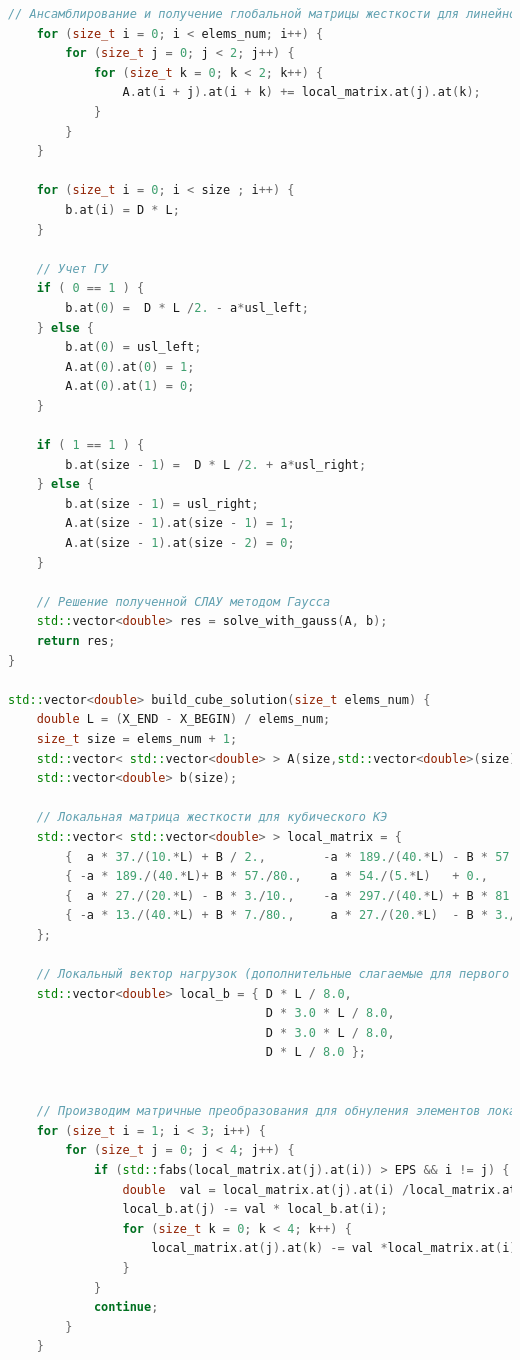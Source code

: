 \begin{lstlisting}[language=c++, label=prog,caption={\textit{Реализация МКЭ}}]
    // Ансамблирование и получение глобальной матрицы жесткости для линейного КЭ
    for (size_t i = 0; i < elems_num; i++) {
        for (size_t j = 0; j < 2; j++) {
            for (size_t k = 0; k < 2; k++) {
                A.at(i + j).at(i + k) += local_matrix.at(j).at(k);
            }
        }
    }

    for (size_t i = 0; i < size ; i++) {
        b.at(i) = D * L;
    }

    // Учет ГУ
    if ( 0 == 1 ) {
        b.at(0) =  D * L /2. - a*usl_left;
    } else {
        b.at(0) = usl_left;
        A.at(0).at(0) = 1;
        A.at(0).at(1) = 0;
    }

    if ( 1 == 1 ) {
        b.at(size - 1) =  D * L /2. + a*usl_right;
    } else {
        b.at(size - 1) = usl_right;
        A.at(size - 1).at(size - 1) = 1;
        A.at(size - 1).at(size - 2) = 0;
    }

    // Решение полученной СЛАУ методом Гаусса
    std::vector<double> res = solve_with_gauss(A, b);
    return res;
}

std::vector<double> build_cube_solution(size_t elems_num) {
    double L = (X_END - X_BEGIN) / elems_num;
    size_t size = elems_num + 1;
    std::vector< std::vector<double> > A(size,std::vector<double>(size));
    std::vector<double> b(size);
    
    // Локальная матрица жесткости для кубического КЭ
    std::vector< std::vector<double> > local_matrix = {
        {  a * 37./(10.*L) + B / 2.,        -a * 189./(40.*L) - B * 57./80.,    a * 27./(20.*L)   + B * 3./10.,    -a * 13./(40.*L)   - B * 7./80. },
        { -a * 189./(40.*L)+ B * 57./80.,    a * 54./(5.*L)   + 0.,            -a * 297./(40.*L)  - B * 81./80.,    a * 27./(20.*L)   + B * 3./10. },
        {  a * 27./(20.*L) - B * 3./10.,    -a * 297./(40.*L) + B * 81./80.,    a * 54./(5.*L)    - 0.,            -a * 189./(40.*L)  - B * 57./80.},
        { -a * 13./(40.*L) + B * 7./80.,     a * 27./(20.*L)  - B * 3./10.,    -a * 189./(40.*L)  + B * 57./80.,    a * 37./(10.*L)   - B * 1./2.}
    };
    
    // Локальный вектор нагрузок (дополнительные слагаемые для первого и последнего элементов учитываются далее)
    std::vector<double> local_b = { D * L / 8.0,
                                    D * 3.0 * L / 8.0,
                                    D * 3.0 * L / 8.0,
                                    D * L / 8.0 };

    
    // Производим матричные преобразования для обнуления элементов локальной матрицы жесткости, относящихся к внутренним узлам
    for (size_t i = 1; i < 3; i++) {
        for (size_t j = 0; j < 4; j++) {
            if (std::fabs(local_matrix.at(j).at(i)) > EPS && i != j) {
                double  val = local_matrix.at(j).at(i) /local_matrix.at(i).at(i);
                local_b.at(j) -= val * local_b.at(i);
                for (size_t k = 0; k < 4; k++) {
                    local_matrix.at(j).at(k) -= val *local_matrix.at(i).at(k);
                }
            }
            continue;
        }
    }
    

\end{lstlisting}
